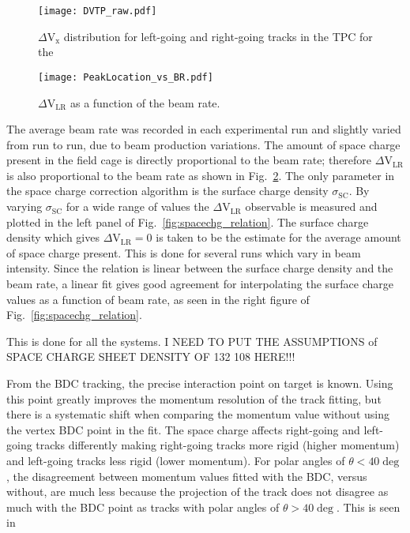 \begin{figure}[H]
\texttt{[image: DVTP\_raw.pdf]}
\caption{$\Delta\mathrm{V}_\mathrm{x}$ distribution for left-going and right-going tracks in the TPC for the }
\label{fig:spacechg_cartoon}
\end{figure}


\begin{figure}[H]
\texttt{[image: PeakLocation\_vs\_BR.pdf]}
\caption{$\Delta\mathrm{V}_\mathrm{LR}$ as a function of the beam rate. }
\label{fig:spacechg_br}
\end{figure}

The average beam rate was recorded in each experimental run and slightly varied from run to run, due to beam production variations. The amount of space charge present in the field cage is directly proportional to the beam rate; therefore $\Delta\mathrm{V}_\mathrm{LR}$ is also proportional to the beam rate as shown in Fig.~\ref{fig:spacechg_br}. The only parameter in the space charge correction algorithm is the surface charge density $\sigma_{\mathrm{SC}}$. By varying $\sigma_{\mathrm{SC}}$ for a wide range of values the $\Delta\mathrm{V}_\mathrm{LR}$ observable is measured and plotted in the left panel of Fig.~\ref{fig:spacechg_relation}. The surface charge density which gives $\Delta\mathrm{V}_\mathrm{LR} = 0$ is taken to be the estimate for the average amount of space charge present. This is done for several runs which vary in beam intensity. Since the relation is linear between the surface charge density and the beam rate, a linear fit gives good agreement for interpolating the surface charge values as a function of beam rate, as seen in the right figure of Fig.~\ref{fig:spacechg_relation}.

This is done for all the systems. I NEED TO PUT THE ASSUMPTIONS of SPACE CHARGE SHEET DENSITY OF 132 108 HERE!!!

From the BDC tracking, the precise interaction point on target is known. Using this point greatly improves the momentum resolution of the track fitting, but there is a systematic shift when comparing the momentum value without using the vertex BDC point in the fit. The space charge affects right-going and left-going tracks differently making right-going tracks more rigid (higher momentum) and left-going tracks less rigid (lower momentum). For polar angles of $\theta < 40 \deg$, the disagreement between momentum values fitted with the BDC, versus without, are much less because the projection of the track does not disagree as much with the BDC point as tracks with polar angles of $\theta > 40 \deg$. This is seen in 


